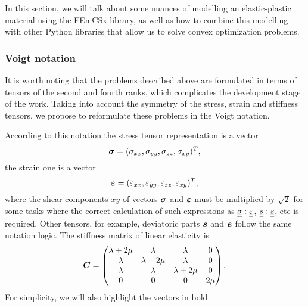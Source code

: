 \documentclass[12pt]{article}
\begin{document}
In this section, we will talk about some nuances of modelling an elastic-plastic material using the FEniCSx library, as well as how to combine this modelling with other Python libraries that allow us to solve convex optimization problems.

\subsubsection{Voigt notation}

It is worth noting that the problems described above are formulated in terms of tensors of the second and fourth ranks, which complicates the development stage of the work. Taking into account the symmetry of the stress, strain and stiffness tensors, we propose to reformulate these problems in the Voigt notation.

According to this notation the stress tensor representation is a vector
\begin{equation*}
    \mbox{\boldmath $\sigma$} = (\sigma_{xx}, \sigma_{yy}, \sigma_{zz}, \sigma_{xy})^T,  
\end{equation*}
the strain one is a vector
\begin{equation*}
    \mbox{\boldmath $\varepsilon$} = (\varepsilon_{xx}, \varepsilon_{yy}, \varepsilon_{zz}, \varepsilon_{xy})^T,
\end{equation*}
where the shear components $xy$ of vectors $\mbox{\boldmath $\sigma$}$ and $\mbox{\boldmath $\varepsilon$}$ must be multiplied by $\sqrt{2}$ for some tasks where the correct calculation of such expressions as $\underline{\underline{\sigma}}:\underline{\underline{\varepsilon}}$, $\underline{\underline{s}}:\underline{\underline{s}}$, etc is required. Other tensors, for example, deviatoric parts $\mbox{\boldmath $s$}$ and $\mbox{\boldmath $e$}$ follow the same notation logic. The stiffness matrix of linear elasticity is 
\begin{equation*}
    \mbox{\boldmath $C$} = 
    \begin{pmatrix}
        \lambda + 2\mu & \lambda & \lambda & 0 \\
        \lambda & \lambda + 2\mu & \lambda & 0 \\
        \lambda & \lambda & \lambda + 2\mu & 0 \\
        0 & 0 & 0 & 2\mu 
    \end{pmatrix}.
\end{equation*}
For simplicity, we will also highlight the vectors in bold.
\end{document}
